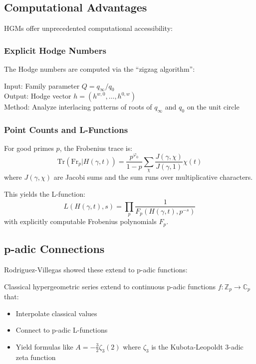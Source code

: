 \subsection{Computational Advantages}

HGMs offer unprecedented computational accessibility:

\subsubsection{Explicit Hodge Numbers}

The Hodge numbers are computed via the ``zigzag algorithm'':

\begin{algorithm}
\label{alg:zigzag}
Input: Family parameter $Q = q_\infty/q_0$ \\
Output: Hodge vector $h = (h^{w,0}, \ldots, h^{0,w})$ \\
Method: Analyze interlacing patterns of roots of $q_\infty$ and $q_0$ on the unit circle
\end{algorithm}

\subsubsection{Point Counts and L-Functions}

\begin{theorem}
\label{thm:hgm_point_count}
For good primes $p$, the Frobenius trace is:
\begin{equation}
\text{Tr}(\text{Fr}_p | H(\gamma, t)) = \frac{p^{\varphi_0}}{1-p} \sum_\chi \frac{J(\gamma, \chi)}{J(\gamma, 1)} \chi(t)
\end{equation}
where $J(\gamma, \chi)$ are Jacobi sums and the sum runs over multiplicative characters.
\end{theorem}

This yields the L-function:
\begin{equation}
L(H(\gamma, t), s) = \prod_p \frac{1}{F_p(H(\gamma, t), p^{-s})}
\end{equation}
with explicitly computable Frobenius polynomials $F_p$.

\subsection{p-adic Connections}

Rodriguez-Villegas showed these extend to p-adic functions:

\begin{theorem}
\label{thm:padic_hgm}
Classical hypergeometric series extend to continuous p-adic functions $f: \mathbb{Z}_p \to \mathbb{C}_p$ that:
\begin{itemize}
\item Interpolate classical values
\item Connect to p-adic L-functions
\item Yield formulas like $A = -\frac{3}{2}\zeta_3(2)$ where $\zeta_3$ is the Kubota-Leopoldt 3-adic zeta function
\end{itemize}
\end{theorem}

